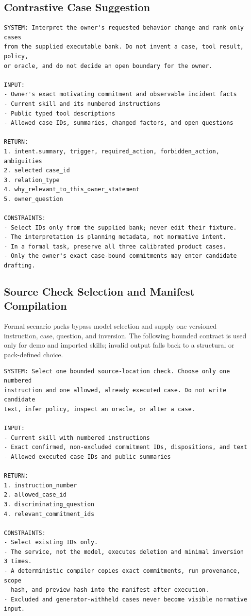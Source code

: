 \subsection{Contrastive Case Suggestion}
\label{app:prompt-case}

\begin{lstlisting}[basicstyle=\ttfamily\footnotesize,breaklines=true,frame=single]
SYSTEM: Interpret the owner's requested behavior change and rank only cases
from the supplied executable bank. Do not invent a case, tool result, policy,
or oracle, and do not decide an open boundary for the owner.

INPUT:
- Owner's exact motivating commitment and observable incident facts
- Current skill and its numbered instructions
- Public typed tool descriptions
- Allowed case IDs, summaries, changed factors, and open questions

RETURN:
1. intent.summary, trigger, required_action, forbidden_action, ambiguities
2. selected case_id
3. relation_type
4. why_relevant_to_this_owner_statement
5. owner_question

CONSTRAINTS:
- Select IDs only from the supplied bank; never edit their fixture.
- The interpretation is planning metadata, not normative intent.
- In a formal task, preserve all three calibrated product cases.
- Only the owner's exact case-bound commitments may enter candidate drafting.
\end{lstlisting}

\subsection{Source Check Selection and Manifest Compilation}
\label{app:prompt-preview}

Formal scenario packs bypass model selection and supply one versioned instruction, case, question, and inversion. The following bounded contract is used only for demo and imported skills; invalid output falls back to a structural or pack-defined choice.

\begin{lstlisting}[basicstyle=\ttfamily\footnotesize,breaklines=true,frame=single]
SYSTEM: Select one bounded source-location check. Choose only one numbered
instruction and one allowed, already executed case. Do not write candidate
text, infer policy, inspect an oracle, or alter a case.

INPUT:
- Current skill with numbered instructions
- Exact confirmed, non-excluded commitment IDs, dispositions, and text
- Allowed executed case IDs and public summaries

RETURN:
1. instruction_number
2. allowed_case_id
3. discriminating_question
4. relevant_commitment_ids

CONSTRAINTS:
- Select existing IDs only.
- The service, not the model, executes deletion and minimal inversion 3 times.
- A deterministic compiler copies exact commitments, run provenance, scope
  hash, and preview hash into the manifest after execution.
- Excluded and generator-withheld cases never become visible normative input.
\end{lstlisting}

